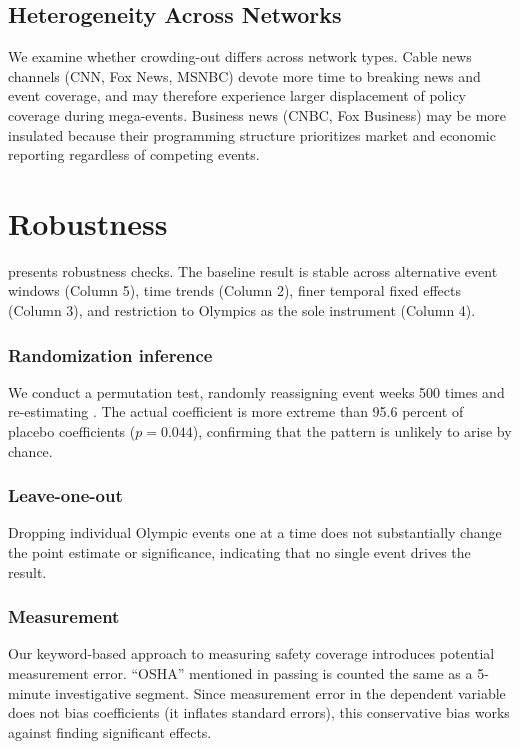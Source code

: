 \documentclass[12pt]{article}
\begin{document}
\subsection{Heterogeneity Across Networks}

We examine whether crowding-out differs across network types. Cable news channels (CNN, Fox News, MSNBC) devote more time to breaking news and event coverage, and may therefore experience larger displacement of policy coverage during mega-events. Business news (CNBC, Fox Business) may be more insulated because their programming structure prioritizes market and economic reporting regardless of competing events.


\section{Robustness}\label{sec:robustness}

{\small}

 presents robustness checks. The baseline result is stable across alternative event windows (Column 5), time trends (Column 2), finer temporal fixed effects (Column 3), and restriction to Olympics as the sole instrument (Column 4).

\subsubsection*{Randomization inference} We conduct a permutation test, randomly reassigning event weeks 500 times and re-estimating . The actual coefficient is more extreme than 95.6 percent of placebo coefficients ($p = 0.044$), confirming that the pattern is unlikely to arise by chance.

\subsubsection*{Leave-one-out} Dropping individual Olympic events one at a time does not substantially change the point estimate or significance, indicating that no single event drives the result.

\subsubsection*{Measurement} Our keyword-based approach to measuring safety coverage introduces potential measurement error. ``OSHA'' mentioned in passing is counted the same as a 5-minute investigative segment. Since measurement error in the dependent variable does not bias coefficients (it inflates standard errors), this conservative bias works against finding significant effects.
\end{document}

